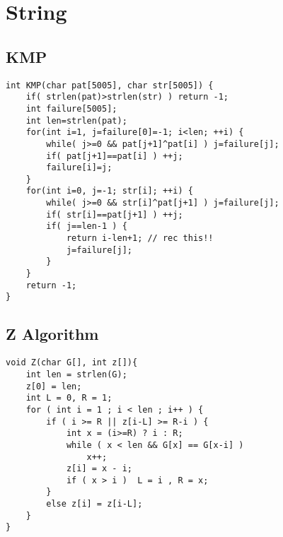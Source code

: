 \documentclass[11pt,twocolumn,a4paper]{article}
\begin{document}
\newpage
\section{String}
\subsection{KMP}
\begin{lstlisting}[label=KMP]
int KMP(char pat[5005], char str[5005]) {
	if( strlen(pat)>strlen(str) ) return -1;
	int failure[5005];
	int len=strlen(pat);
	for(int i=1, j=failure[0]=-1; i<len; ++i) {
		while( j>=0 && pat[j+1]^pat[i] ) j=failure[j];
		if( pat[j+1]==pat[i] ) ++j;
		failure[i]=j;
	}
	for(int i=0, j=-1; str[i]; ++i) {
		while( j>=0 && str[i]^pat[j+1] ) j=failure[j];
		if( str[i]==pat[j+1] ) ++j;
		if( j==len-1 ) {
			return i-len+1; // rec this!!
			j=failure[j];
		}
	}
	return -1;
}
\end{lstlisting}

\subsection{Z Algorithm}
\begin{lstlisting}[label=Z Algorithm]
void Z(char G[], int z[]){
	int len = strlen(G);
	z[0] = len;
	int L = 0, R = 1;
	for ( int i = 1 ; i < len ; i++ ) {
		if ( i >= R || z[i-L] >= R-i ) {
			int x = (i>=R) ? i : R;
			while ( x < len && G[x] == G[x-i] )  
				x++;
			z[i] = x - i;
			if ( x > i )  L = i , R = x;	
		}		
		else z[i] = z[i-L];
	}
}
\end{lstlisting}

\newpage
\end{document}
